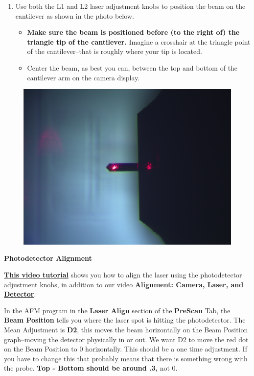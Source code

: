 \documentclass{../lab}
\begin{document}
\begin{enumerate}
    \item Use both the L1 and L2 laser adjustment knobs to position the beam on the cantilever as shown in the photo below.

    \begin{itemize}
        \item \textbf{Make sure the beam is positioned before (to the right of) the triangle tip of the cantilever. } Imagine a crosshair at the triangle point of the cantilever--that is roughly where your tip is located.

        \item Center the beam, as best you can, between the top and bottom of the cantilever arm on the camera display.

    \end{itemize}

\end{enumerate}


\begin{figure}[h]
    \centering
    \href{http://dev-physicsadv.pantheon.berkeley.edu/sites/default/files/AFMImages/laser_align.png}{\includegraphics[width=0.5\linewidth]{images/laser_align.png}}
    \caption{}
    \label{fig:laser_align}
\end{figure}

\textbf{Photodetector Alignment}

\href{http://experimentationlab.berkeley.edu/sites/default/files/AFMImages/5.0\%20\%20Phtodetector\%20Alignment\%28V1.0\%29.wmv}{\textbf{This video tutorial}} shows you how to align the laser using the photodetector adjustment knobs, in addition to our video  \href{http://experimentationlab.berkeley.edu/sites/default/files/alignment\_final2.mp4}{\textbf{Alignment: Camera, Laser, and Detector}}.

In the AFM program in the\textbf{ Laser Align} section of the \textbf{PreScan} Tab, the \textbf{Beam Position} tells you where the laser spot is hitting the photodetector. The Mean Adjustment is \textbf{D2}, this moves the beam horizontally on the Beam Position graph--moving the detector physically in or out.  We want D2 to move the red dot on the Beam Position to 0 horizontally.  This should be a one time adjustment.  If you have to change this that probably means that there is something wrong with the probe. \textbf{Top - Bottom should be around .3, }not 0.
\end{document}
